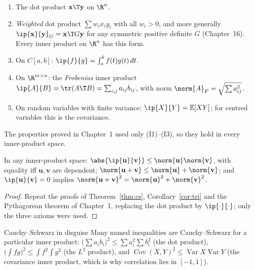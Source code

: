 \begin{example}\label{ex:ips}
\begin{enumerate}[label=(\alph*)]
  \item The dot product $\mathbf{x}\T\mathbf{y}$ on $\R^n$.
  \item \emph{Weighted} dot product $\sum w_ix_iy_i$ with all $w_i>0$, and more generally $\ip{\mathbf{x}}{\mathbf{y}}_G=\mathbf{x}\T G\mathbf{y}$ for any symmetric positive definite $G$ (Chapter~16). Every inner product on $\R^n$ has this form.
  \item On $C[a,b]$: $\ip{f}{g}=\int_a^bf(t)g(t)\,dt$.
  \item On $\R^{m\times n}$: the \emph{Frobenius} inner product $\ip{A}{B}=\tr(A\T B)=\sum_{i,j}a_{ij}b_{ij}$, with norm $\norm{A}_F=\sqrt{\sum a_{ij}^2}$.
  \item On random variables with finite variance: $\ip{X}{Y}=\mathbb{E}[XY]$; for centred variables this is the covariance.
\end{enumerate}
\end{example}

The properties proved in Chapter~1 used only (I1)--(I3), so they hold in every inner-product space.

\begin{theorem}\label{thm:csgen}
In any inner-product space: $\abs{\ip{\mathbf{u}}{\mathbf{v}}}\le\norm{\mathbf{u}}\norm{\mathbf{v}}$, with equality iff $\mathbf{u},\mathbf{v}$ are dependent; $\norm{\mathbf{u}+\mathbf{v}}\le\norm{\mathbf{u}}+\norm{\mathbf{v}}$; and $\ip{\mathbf{u}}{\mathbf{v}}=0$ implies $\norm{\mathbf{u}+\mathbf{v}}^2=\norm{\mathbf{u}}^2+\norm{\mathbf{v}}^2$.
\end{theorem}

\begin{proof}
Repeat the proofs of Theorem~\ref{thm:cs}, Corollary~\ref{cor:tri} and the Pythagorean theorem of Chapter~1, replacing the dot product by $\ip{\cdot}{\cdot}$; only the three axioms were used.
\end{proof}

\begin{interview}{Cauchy--Schwarz in disguise}
Many named inequalities are Cauchy--Schwarz for a particular inner product: $\big(\sum a_ib_i\big)^2\le\sum a_i^2\sum b_i^2$ (the dot product), $\big(\int fg\big)^2\le\int f^2\int g^2$ (the $L^2$ product), and $\operatorname{Cov}(X,Y)^2\le\operatorname{Var}X\operatorname{Var}Y$ (the covariance inner product, which is why correlation lies in $[-1,1]$).
\end{interview}

